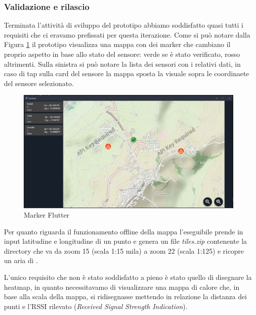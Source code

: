 \documentclass[a4paper]{report}
\begin{document}
\subsubsection*{{Validazione e rilascio}}
Terminata l'attività di sviluppo del prototipo abbiamo soddisfatto quasi tutti i requisiti che ci eravamo prefissati per questa iterazione. Come si può notare dalla Figura \ref{marker_flutter} il prototipo visualizza una mappa con dei marker che cambiano il proprio aspetto in base allo stato del sensore: verde se è stato verificato, rosso altrimenti. Sulla sinistra si può notare la lista dei sensori con i relativi dati, in caso di tap sulla card del sensore la mappa sposta la visuale sopra le coordinaete del sensore selezionato. 
\begin{figure}[tbp]
    \centering
    \includegraphics[width=\textwidth]{figure/marker_flutter.png}
    \caption{Marker Flutter}
    \label{marker_flutter}
\end{figure}

Per quanto riguarda il funzionamento offline della mappa l'eseguibile prende in input latitudine e longitudine di un punto e genera un file \textit{tiles.zip} contenente la directory
\setnewpathsep{/}  che va da zoom 15 (scala 1:15 mila) a zoom 22 (scala 1:125) e ricopre un aria di . 


L'unico requisito che non è stato soddisfatto a pieno è stato quello di disegnare la heatmap, in quanto necessitavamo di visualizzare una mappa di calore che, in base alla scala della mappa, si ridisegnasse mettendo in relazione la distanza dei punti e l'RSSI rilevato (\textit{Received Signal Strength Indication}).
\end{document}

